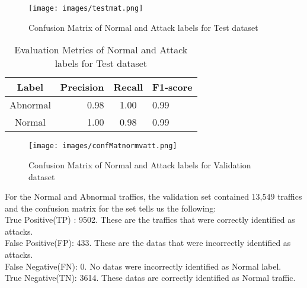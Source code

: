  \begin{figure}[tbh] %
	\begin{center}
		\texttt{[image: images/testmat.png]} 
		\caption{Confusion Matrix of Normal and Attack labels for Test dataset} %
		\label{Confusion Matrix of Normal and Attack labels for Test dataset} 
	\end{center}
\end{figure}
\begin{table}[tbh]
	\centering
	\caption{Evaluation Metrics of Normal and Attack labels for Test dataset}
	\begin{tabular}{|c|r|c|l|} %
		\hline %
		Label  &Precision &Recall &F1-score \\
		\hline %
		Abnormal &0.98 &1.00 &0.99 \\
		\hline %
		Normal &1.00 &0.98 &0.99\\
		\hline
	\end{tabular}
	\label{Evaluation Metrics of Normal and Attack labels for test dataset}
\end{table}
 \begin{figure}[tbh] %
 	\begin{center}
 		\texttt{[image: images/confMatnormvatt.png]} 
 		\caption{Confusion Matrix of Normal and Attack labels for Validation dataset} %
 		\label{Confusion Matrix of Normal and Attack labels for Validation dataset} 
 	\end{center}
 \end{figure}
For the Normal and Abnormal traffics, the validation set contained 13,549 traffics and the confusion matrix for the set tells us the following:\\ 
True Positive(TP) : 9502. These are the traffics that were correctly identified as attacks.\\
False Positive(FP): 433. These are the datas that were incorrectly identified as attacks.\\
False Negative(FN): 0. No datas were incorrectly identified as Normal label.\\
True Negative(TN): 3614. These datas are correctly identified as Normal traffic.\\
